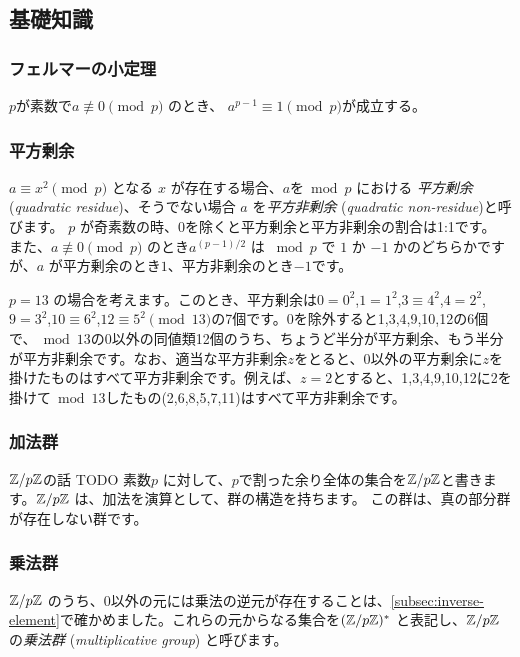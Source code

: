 \documentclass{jsarticle}
\begin{document}
  \subsection{基礎知識}
  \label{subsec:group-preliminaries}
   \subsubsection{フェルマーの小定理}
   \begin{theorem}
    \label{thm:fermats-little-theorem}
    $p$が素数で$a \not \equiv 0 \pmod p$ のとき、 $a^{p-1} \equiv 1 \pmod p$が成立する。
   \end{theorem}
   \subsubsection{平方剰余}
   \label{subsubsec:quadratic-residue}
   $a \equiv x^2 \pmod p$ となる $x$ が存在する場合、$a$を${}\bmod p$ における \emph{平方剰余} (\emph{quadratic residue})、そうでない場合 $a$ を\emph{平方非剰余} (\emph{quadratic non-residue})と呼びます。
   $p$ が奇素数の時、0を除くと平方剰余と平方非剰余の割合は1:1です。
   また、$a\not\equiv 0 \pmod p$ のとき$a^{(p-1)/2}$ は ${}\bmod p$ で $1$ か $-1$ かのどちらかですが、$a$ が平方剰余のとき$1$、平方非剰余のとき$-1$です。
   \begin{example}
    $p = 13$ の場合を考えます。このとき、平方剰余は$0=0^2$,$1=1^2$,$3\equiv 4^2$,$4=2^2$,$9=3^2$,$10\equiv 6^2$,$12 \equiv 5^2 \pmod{13}$の7個です。0を除外すると1,3,4,9,10,12の6個で、${}\bmod 13$の0以外の同値類12個のうち、ちょうど半分が平方剰余、もう半分が平方非剰余です。なお、適当な平方非剰余$z$をとると、0以外の平方剰余に$z$を掛けたものはすべて平方非剰余です。例えば、$z=2$とすると、1,3,4,9,10,12に2を掛けて${}\bmod 13$したもの(2,6,8,5,7,11)はすべて平方非剰余です。
   \end{example}
   \subsubsection{加法群}
   $\mathbb{Z}/p\mathbb{Z}$の話 TODO
   素数$p$ に対して、$p$で割った余り全体の集合を$\mathbb{Z}/p\mathbb{Z}$と書きます。$\mathbb{Z}/p\mathbb{Z}$ は、加法を演算として、群の構造を持ちます。
   この群は、真の部分群が存在しない群です。
   \subsubsection{乗法群}
   $\mathbb{Z}/p\mathbb{Z}$ のうち、0以外の元には乗法の逆元が存在することは、\ref{subsec:inverse-element}で確かめました。これらの元からなる集合を$(\mathbb{Z}/p\mathbb{Z})^*$ と表記し、$\mathbb{Z}/p\mathbb{Z}$の\emph{乗法群}  (\emph{multiplicative group}) と呼びます。
\end{document}
